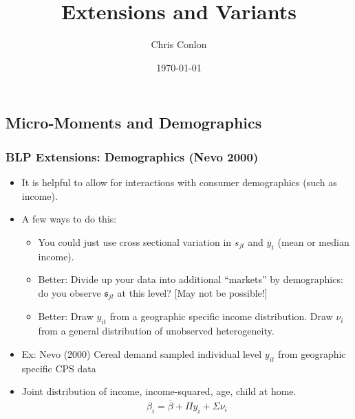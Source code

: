 



\title{Extensions and Variants}
\author{Chris Conlon}
\date{\today}

\frame{\titlepage}

\subsection*{Micro-Moments and Demographics}
\begin{frame}
\frametitle{BLP Extensions: Demographics (Nevo 2000)}
\begin{itemize}
\item It is helpful to allow for interactions with consumer demographics (such as income).
\item A few ways to do this:
\begin{itemize}
\item You could just use cross sectional variation in $s_{jt}$ and $\overline{y}_t$ (mean or median income).
\item Better: Divide up your data into additional ``markets'' by demographics: do you observe $\mathfrak{s}_{jt}$ at this level? [May not be possible!]
\item Better: Draw $y_{it}$ from a geographic specific income distribution. Draw $\nu_i$ from a general distribution of unobserved heterogeneity.
\end{itemize}
\item Ex: Nevo (2000) Cereal demand sampled individual level $y_{it}$ from geographic specific CPS data
\item Joint distribution of income, income-squared, age, child at home.
\begin{align*}
\beta_i = \overline{\beta} + \Pi y_i + \Sigma \nu_i
\end{align*}
\end{itemize}
\end{frame}

